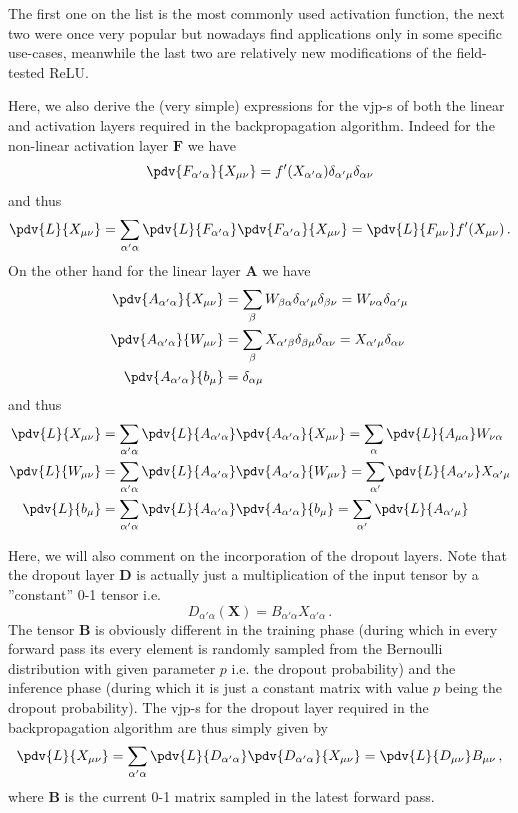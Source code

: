 \documentclass[a5paper]{article}
\begin{document}
The first one on the list is the most commonly used activation function, the next two were once very
popular but nowadays find applications only in some specific use-cases, meanwhile the last two are
relatively new modifications of the field-tested ReLU.

Here, we also derive the (very simple) expressions for the vjp-s of both the linear and activation
layers required in the backpropagation algorithm. Indeed for the non-linear activation layer
$\bm{F}$ we have
\[
   \pdv{F_{\alpha'\alpha}}{X_{\mu\nu}} = f'(X_{\alpha'\alpha}) \delta_{\alpha'\mu} \delta_{\alpha\nu}
\]
and thus
\[
   \pdv{L}{X_{\mu\nu}} = \sum_{\alpha'\alpha} \pdv{L}{F_{\alpha'\alpha}} \pdv{F_{\alpha'\alpha}}{X_{\mu\nu}} = \pdv{L}{F_{\mu\nu}} f'(X_{\mu\nu})\,.
\]
On the other hand for the linear layer $\bm{A}$ we have
\[
\begin{split}
   \pdv{A_{\alpha'\alpha}}{X_{\mu\nu}} &= \sum_{\beta} W_{\beta\alpha} \delta_{\alpha'\mu} \delta_{\beta\nu} = W_{\nu\alpha} \delta_{\alpha'\mu}\\
   \pdv{A_{\alpha'\alpha}}{W_{\mu\nu}} &= \sum_{\beta} X_{\alpha'\beta} \delta_{\beta\mu} \delta_{\alpha\nu} = X_{\alpha'\mu} \delta_{\alpha\nu}\\
   \pdv{A_{\alpha'\alpha}}{b_{\mu}   } &= \delta_{\alpha\mu}
\end{split}
\]
and thus
\[
\begin{split}
   \pdv{L}{X_{\mu\nu}} &= \sum_{\alpha'\alpha} \pdv{L}{A_{\alpha'\alpha}} \pdv{A_{\alpha'\alpha}}{X_{\mu\nu}} = \sum_{\alpha} \pdv{L}{A_{\mu\alpha}} W_{\nu\alpha} \\
   \pdv{L}{W_{\mu\nu}} &= \sum_{\alpha'\alpha} \pdv{L}{A_{\alpha'\alpha}} \pdv{A_{\alpha'\alpha}}{W_{\mu\nu}} = \sum_{\alpha'} \pdv{L}{A_{\alpha'\nu}} X_{\alpha'\mu} \\
   \pdv{L}{b_\mu     } &= \sum_{\alpha'\alpha} \pdv{L}{A_{\alpha'\alpha}} \pdv{A_{\alpha'\alpha}}{b_\mu     } = \sum_{\alpha'} \pdv{L}{A_{\alpha'\mu}}
\end{split}
\]

Here, we will also comment on the incorporation of the dropout layers. Note that the dropout layer
$\bm{D}$ is actually just a multiplication of the input tensor by a ''constant'' 0-1 tensor i.e.
\[
   D_{\alpha'\alpha}(\bm{X}) = B_{\alpha'\alpha} X_{\alpha'\alpha}\,.
\]
The tensor $\bm{B}$ is obviously different in the training phase (during which in every forward pass
its every element is randomly sampled from the Bernoulli distribution with given parameter $p$ i.e.
the dropout probability) and the inference phase (during which it is just a constant matrix with
value $p$ being the dropout probability). The vjp-s for the dropout layer required in the
backpropagation algorithm are thus simply given by
\[
   \pdv{L}{X_{\mu\nu}} = \sum_{\alpha'\alpha} \pdv{L}{D_{\alpha'\alpha}} \pdv{D_{\alpha'\alpha}}{X_{\mu\nu}} = \pdv{L}{D_{\mu\nu}} B_{\mu\nu}\,,
\]
where $\bm{B}$ is the current 0-1 matrix sampled in the latest forward pass.
\end{document}
